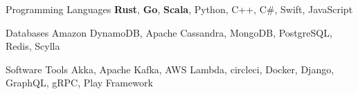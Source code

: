 

\begin{cvskills}

  \cvskill
    {Programming Languages} %
    {{\bf Rust}, {\bf Go}, {\bf Scala}, Python, C++, C\#, Swift, JavaScript} %

  \cvskill
    {Databases} %
    {Amazon DynamoDB, Apache Cassandra, MongoDB, PostgreSQL, Redis, Scylla} %

  \cvskill
    {Software Tools} %
    {Akka, Apache Kafka, AWS Lambda, circleci, Docker, Django, GraphQL, gRPC, Play Framework} %

\end{cvskills}
